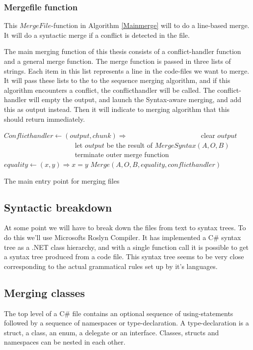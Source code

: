 \documentclass[11pt]{article}
\begin{document}
\subsubsection{Mergefile function}
This $MergeFile$-function in Algorithm \ref{Mainmerge} will to do a line-based merge. It will do a syntactic merge if a conflict is detected in the file.

The main merging function of this thesis consists of a conflict-handler function and a general merge function. The merge function is passed in three lists of strings. Each item in this list represents a line in the code-files we want to merge. It will pass these lists to the to the sequence merging algorithm, and if this algorithm encounters a conflict, the conflicthandler will be called. The conflict-handler will empty the output, and launch the Syntax-aware merging, and add this as output instead. Then it will indicate to merging algorithm that this should return immediately.

\begin{algorithm}
\begin{algorithmic}
   \State $Conflicthandler \gets (output, chunk) \Rightarrow$
      \State ~~~~~~~~~~~~~~~~~~~~ clear $output$
      \State ~~~~~~~~~~~~~~~~~~~~ let $output$ be the result of $MergeSyntax(A, O, B)$
      \State ~~~~~~~~~~~~~~~~~~~~ terminate outer merge function
	\State $equality \gets (x, y) \Rightarrow x = y$
	\State \Return $Merge(A, O, B, equality, conflicthandler)$
\EndFunction
\end{algorithmic}
\caption{The main entry point for merging files}
  \label{Mainmerge}
\end{algorithm}

\subsection{Syntactic breakdown}
At some point we will have to break down the files from text to syntax trees. To do this we'll use Microsofts Roslyn Compiler. It has implemented a C\# syntax tree as a .NET class hierarchy, and with a single function call it is possible to get a syntax tree produced from a code file. This syntax tree seems to be very close corresponding to the actual grammatical rules set up by it's languages.



\subsection{Merging classes}
\label{mergingclasses}
The top level of a C\# file contains an optional sequence of using-statements followed by a sequence of namespaces or type-declaration. A type-declaration is a struct, a class, an enum, a delegate or an interface. Classes, structs and namespaces can be nested in each other.
\end{document}
